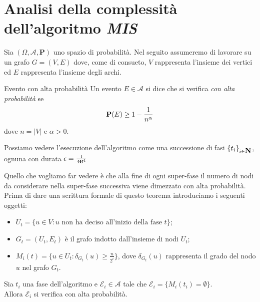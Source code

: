 \documentclass{article}
\begin{document}
\maketitle

\section{Analisi della complessit\`a dell'algoritmo \emph{MIS}}
Sia $(\Omega, \mathcal{A}, \mathbf{P})$ uno spazio di probabilit\`a.
Nel seguito assumeremo di lavorare su un grafo $G = (V, E)$ dove, come
di consueto, $V$ rappresenta l'insieme dei vertici ed $E$ rappresenta 
l'insieme degli archi.

\begin{defn}{Evento con alta probabilit\`a}
Un evento $E \in \mathcal{A}$ si dice che si verifica \emph{
con alta probabilit\`a} se 
\begin{displaymath}
    \mathbf{P}(E) \geq 1 - {{1} \over {n^\alpha}} 
\end{displaymath}
dove $n = |V|$ e $\alpha > 0$.
\end{defn}

Possiamo vedere l'esecuzione dell'algoritmo come una successione di fasi
$\lbrace t_i \rbrace_{i \in \mbox{{\bfseries N}}}$, ognuna con durata $\epsilon = 
{{1} \over {4\mbox{{\bfseries e}}^{4}}}$

Quello che vogliamo far vedere \`e che alla fine di ogni super-fase il 
numero di nodi da considerare nella super-fase successiva viene 
dimezzato con alta probabilit\`a. Prima di dare una scrittura formale di questo 
teorema introduciamo i seguenti oggetti:
\begin{itemize}
    \item $U_t = \lbrace u \in V : u \text{ non ha deciso all'inizio della
        fase } t \rbrace$;
    \item $G_t = (U_t, E_t)$ \`e il grafo indotto dall'insieme di nodi $U_t$;
    \item $M_i(t) = \lbrace u \in U_t : \delta_{G_t}(u) \geq 
        \frac{n}{2^i} \rbrace$, dove $\delta_{G_t}(u)$ rappresenta il grado
        del nodo $u$ nel grafo $G_t$.
\end{itemize}

\begin{lemma}
    \label{lemma:epsilon-i}
    Sia $t_i$ una fase dell'algoritmo e $\mathcal{E}_i \in \mathcal{A}$ 
    tale che $\mathcal{E}_i = \lbrace M_i(t_i) = \emptyset\rbrace$. \\
    Allora $\mathcal{E}_i$ si verifica con alta probabilit\`a.
\end{lemma}
\end{document}

